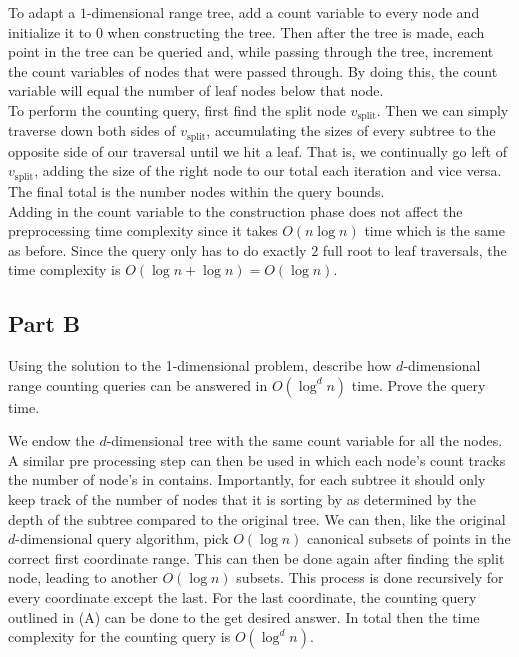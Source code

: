 \documentclass[12pt]{extarticle}
\begin{document}
\begin{solution}
    To adapt a $1$-dimensional range tree, add a count variable to every node and initialize it to $0$ when constructing the tree. Then after the tree is made, each point in the tree can be queried and, while passing through the tree, increment the count variables of nodes that were passed through. By doing this, the count variable will equal the number of leaf nodes below that node.
    \\

    To perform the counting query, first find the split node $v_{\text{split}}$. Then we can simply traverse down both sides of $v_\text{split}$, accumulating the sizes of every subtree to the opposite side of our traversal until we hit a leaf. That is, we continually go left of $v_{\text{split}}$, adding the size of the right node to our total each iteration and vice versa. The final total is the number nodes within the query bounds.
    \\

    Adding in the count variable to the construction phase does not affect the preprocessing time complexity since it takes $O(n \log n)$ time which is the same as before. Since the query only has to do exactly $2$ full root to leaf traversals, the time complexity is $O(\log n + \log n) = O(\log n)$.
\end{solution}

\subsection*{Part B}
Using the solution to the 1-dimensional problem, describe how $d$-dimensional range counting queries can be answered in $O(\log^d n)$ time. Prove the query time.

\begin{solution}
    We endow the $d$-dimensional tree with the same count variable for all the nodes. A similar pre processing step can then be used in which each node's count tracks the number of node's in contains. Importantly, for each subtree it should only keep track of the number of nodes that it is sorting by as determined by the depth of the subtree compared to the original tree. We can then, like the original $d$-dimensional query algorithm, pick $O(\log n)$ canonical subsets of points in the correct first coordinate range. This can then be done again after finding the split node, leading to another $O(\log n)$ subsets. This process is done recursively for every coordinate except the last. For the last coordinate, the counting query outlined in (A) can be done to the get desired answer. In total then the time complexity for the counting query is $O(\log^d n)$.
\end{solution}
\end{document}
